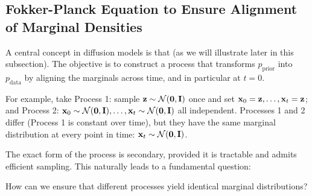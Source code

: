 \subsection{Fokker-Planck Equation to Ensure Alignment of Marginal Densities}
A central concept in diffusion models is that  (as we will illustrate later in this subsection).
 The objective is to construct a process that transforms $p_{\mathrm{prior}}$ into $p_{\mathrm{data}}$ by aligning the marginals across time, and in particular at $t=0$.
\begin{nknote}
\noindent For example, take Process 1: sample ${\mathbf{z}} \sim \mathcal{N}(\bm{0},{\mathbf{I}})$ once and set ${\mathbf{x}}_0 = {\mathbf{z}}, \ldots, {\mathbf{x}}_t = {\mathbf{z}}$; and Process 2: ${\mathbf{x}}_0 \sim \mathcal{N}(\bm{0},{\mathbf{I}}), \ldots, {\mathbf{x}}_t \sim \mathcal{N}(\bm{0},{\mathbf{I}})$ all independent. Processes 1 and 2 differ (Process 1 is constant over time), but they have the same marginal distribution at every point in time: ${\mathbf{x}}_t \sim \mathcal{N}(\bm{0},{\mathbf{I}})$.
\end{nknote} The exact form of the process is secondary, provided it is tractable and admits efficient sampling. This naturally leads to a fundamental question:


\begin{question}
How can we ensure that different processes yield identical marginal distributions?
\end{question}



